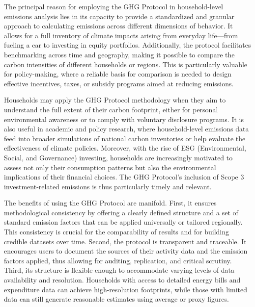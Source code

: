 \documentclass[12pt,a4paper]{article}%
\begin{document}
The principal reason for employing the GHG Protocol in household-level emissions analysis lies in its capacity to provide a standardized and granular approach to calculating emissions across different dimensions of behavior. It allows for a full inventory of climate impacts arising from everyday life—from fueling a car to investing in equity portfolios. Additionally, the protocol facilitates benchmarking across time and geography, making it possible to compare the carbon intensities of different households or regions. This is particularly valuable for policy-making, where a reliable basis for comparison is needed to design effective incentives, taxes, or subsidy programs aimed at reducing emissions.

Households may apply the GHG Protocol methodology when they aim to understand the full extent of their carbon footprint, either for personal environmental awareness or to comply with voluntary disclosure programs. It is also useful in academic and policy research, where household-level emissions data feed into broader simulations of national carbon inventories or help evaluate the effectiveness of climate policies. Moreover, with the rise of ESG (Environmental, Social, and Governance) investing, households are increasingly motivated to assess not only their consumption patterns but also the environmental implications of their financial choices. The GHG Protocol's inclusion of Scope 3 investment-related emissions is thus particularly timely and relevant.

The benefits of using the GHG Protocol are manifold. First, it ensures methodological consistency by offering a clearly defined structure and a set of standard emission factors that can be applied universally or tailored regionally. This consistency is crucial for the comparability of results and for building credible datasets over time. Second, the protocol is transparent and traceable. It encourages users to document the sources of their activity data and the emission factors applied, thus allowing for auditing, replication, and critical scrutiny. Third, its structure is flexible enough to accommodate varying levels of data availability and resolution. Households with access to detailed energy bills and expenditure data can achieve high-resolution footprints, while those with limited data can still generate reasonable estimates using average or proxy figures.
\end{document}
